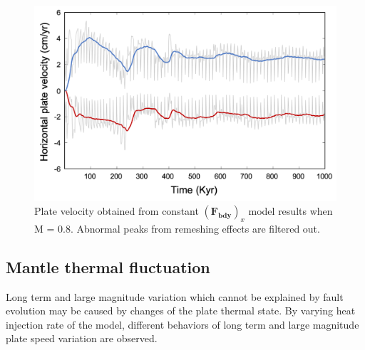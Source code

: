 \documentclass[letterpaper,12pt,notitle]{memphisthesis}                     %
\begin{document}
\begin{figure}[!htb]
	\centering
	\includegraphics[width=0.9\linewidth]{./figs/m08vel.png}
	\caption{Plate velocity obtained from constant $(\boldsymbol{F_{bdy}})_x$ model results when M = 0.8. Abnormal peaks from remeshing effects are filtered out.} 
	\label{fig:m08vel}
\end{figure}

\subsection{Mantle thermal fluctuation}

Long term and large magnitude variation which cannot be explained by fault evolution may be caused by changes of the plate thermal state. By varying heat injection rate of the model, different behaviors of long term and large magnitude plate speed variation are observed. 

\end{document}
